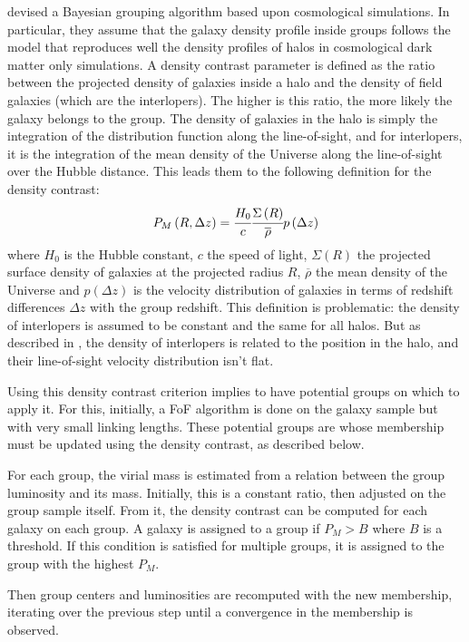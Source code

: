 \cite{Yang+05, Yang+07} devised a Bayesian grouping algorithm based upon
cosmological simulations. In particular, they assume that the galaxy density
profile inside groups follows the \citet{NFW+97} model that reproduces well the
density profiles of halos in cosmological dark matter only simulations. A
density contrast parameter is defined as the ratio between the projected
density of galaxies inside a halo and the density of field galaxies (which are
the interlopers). The higher is this ratio, the more likely the galaxy belongs
to the group. The density of galaxies in the halo is simply the integration of
the distribution function along the line-of-sight, and for interlopers, it is
the integration of the mean density of the Universe along the line-of-sight
over the Hubble distance. This leads them to the following definition for the
density contrast:
%
\begin{equation}
    P_M \left(R, \Delta z\right)=\cfrac{H_0}{c} \cfrac{\Sigma
    \left(R\right)}{\overline{\rho}} p \left(\Delta z\right)
\end{equation}
%
where $H_0$ is the Hubble constant, $c$ the speed of light,
$\Sigma\left(R\right)$ the projected surface density of galaxies at the
projected radius $R$, $\overline{\rho}$ the mean density of the Universe and $p
\left(\Delta z\right)$ is the velocity distribution of galaxies in terms of
redshift differences $\Delta z$ with the group redshift. This definition is
problematic: the density of interlopers is assumed to be constant and the same
for all halos. But as described in \citet{MBM+10}, the density of interlopers
is related to the position in the halo, and their line-of-sight velocity
distribution isn't flat.

Using this density contrast criterion implies to have potential groups on which
to apply it. For this, initially, a FoF algorithm is done on the galaxy sample
but with very small linking lengths. These potential groups are whose
membership must be updated using the density contrast, as described below.

For each group, the virial mass is estimated from a relation between the group
luminosity and its mass. Initially, this is a constant ratio, then adjusted on
the group sample itself. From it, the density contrast can be computed for each
galaxy on each group. A galaxy is assigned to a group if $P_M>B$ where $B$ is a
threshold. If this condition is satisfied for multiple groups, it is assigned
to the group with the highest $P_M$.

Then group centers and luminosities are recomputed with the new membership,
iterating over the previous step until a convergence in the membership is
observed.

